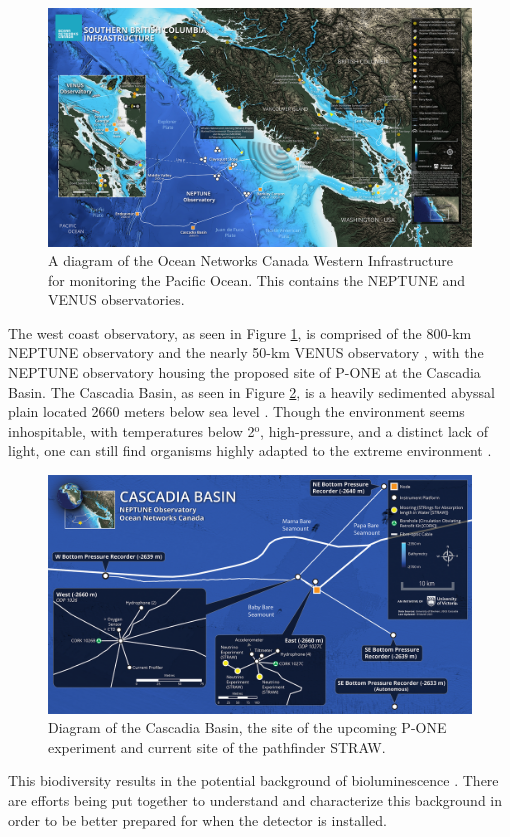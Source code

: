 \begin{figure}[h]
  \centering
  \includegraphics[width=.9\textwidth]{./Figures/western_infrastructure.png}
  \caption{A diagram of the Ocean Networks Canada Western Infrastructure for monitoring the Pacific Ocean. This contains the NEPTUNE and VENUS observatories.}
  \label{fig:west_inf}
\end{figure}

The west coast observatory, as seen in Figure \ref{fig:west_inf}, is comprised of the 800-km NEPTUNE observatory and the nearly 50-km VENUS observatory \cite{onc}, with the NEPTUNE observatory housing the proposed site of P-ONE at the Cascadia Basin. The Cascadia Basin, as seen in Figure \ref{fig:casc}, is a heavily sedimented abyssal plain located 2660 meters below sea level \cite{onc}. Though the environment seems inhospitable, with temperatures below 2$^{\text{o}}$, high-pressure, and a distinct lack of light, one can still find organisms highly adapted to the extreme environment \cite{onc}. 

\begin{figure}
  \centering
  \includegraphics[width=.9\textwidth]{./Figures/cascadia_basin.png}
  \caption{Diagram of the Cascadia Basin, the site of the upcoming P-ONE experiment and current site of the pathfinder STRAW.}
  \label{fig:casc}
\end{figure}

This biodiversity results in the potential background of bioluminescence \cite{pone,onc}. There are efforts being put together to understand and characterize this background in order to be better prepared for when the detector is installed.



